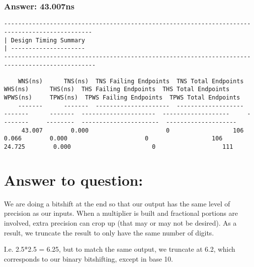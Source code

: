 \documentclass[11pt]{report}
\begin{document}
\subsubsection*{Answer: 43.007ns}
\begin{lstlisting}
-----------------------------------------------------------------------------------------------
| Design Timing Summary
| ---------------------
------------------------------------------------------------------------------------------------

    WNS(ns)      TNS(ns)  TNS Failing Endpoints  TNS Total Endpoints      WHS(ns)      THS(ns)  THS Failing Endpoints  THS Total Endpoints     WPWS(ns)     TPWS(ns)  TPWS Failing Endpoints  TPWS Total Endpoints  
    -------      -------  ---------------------  -------------------      -------      -------  ---------------------  -------------------     --------     --------  ----------------------  --------------------  
     43.007        0.000                      0                  106        0.066        0.000                      0                  106       24.725        0.000                       0                   111  
\end{lstlisting}
\newpage









\normalsize
\section*{Answer to question:}
We are doing a bitshift at the end so that our output has the same level of precision as our inputs. When a multiplier is built and fractional portions are involved, extra precision can crop up (that may or may not be desired). As a result, we truncate the result to only have the same number of digits. 

I.e. 2.5*2.5 = 6.25, but to match the same output, we truncate at 6.2, which corresponds to our binary bitshifting, except in base 10. 
\end{document}
